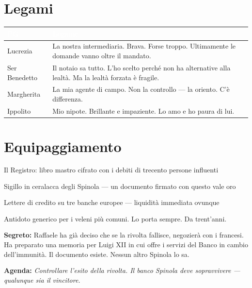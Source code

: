 \section*{Legami}
\begin{table}[h]\centering\renewcommand{\arraystretch}{1.4}
\begin{tabularx}{\linewidth}{@{}L{2.6cm} X@{}}
\toprule{}
\textcolor{white}{\textbf{PG}} & \textcolor{white}{\textbf{Legame}} \\
\midrule
Lucrezia & La nostra intermediaria. Brava. Forse troppo. Ultimamente le domande vanno oltre il mandato. \\
Ser Benedetto & Il notaio sa tutto. L'ho scelto perché non ha alternative alla lealtà. Ma la lealtà forzata è fragile. \\
Margherita & La mia agente di campo. Non la controllo — la oriento. C'è differenza. \\
Ippolito & Mio nipote. Brillante e impaziente. Lo amo e ho paura di lui. \\
\bottomrule
\end{tabularx}
\end{table}

\section*{Equipaggiamento}
\begin{goldlist}
\item Il Registro: libro mastro cifrato con i debiti di trecento persone influenti
\item Sigillo in ceralacca degli Spinola — un documento firmato con questo vale oro
\item Lettere di credito su tre banche europee — liquidità immediata ovunque
\item Antidoto generico per i veleni più comuni. Lo porta sempre. Da trent'anni.
\end{goldlist}

\clearpage
\begin{secretbox}
\textbf{Segreto:} Raffaele ha già deciso che se la rivolta fallisce, negozierà con i francesi. Ha preparato una memoria per Luigi XII in cui offre i servizi del Banco in cambio dell'immunità. Il documento esiste. Nessun altro Spinola lo sa.

\medskip\noindent\textcolor{SecretRed}{\textbf{Agenda:}} \textit{Controllare l'esito della rivolta. Il banco Spinola deve sopravvivere — qualunque sia il vincitore.}
\end{secretbox}

